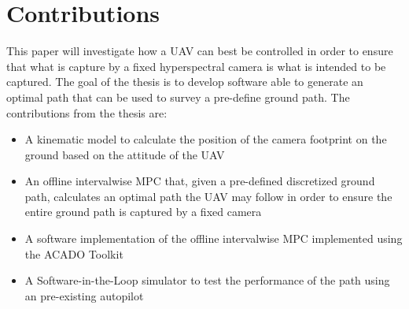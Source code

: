 \section{Contributions}

This paper will investigate how a UAV can best be controlled in order to ensure that what is capture by a fixed hyperspectral camera is what is intended to be captured. The goal of the thesis is to develop software able to generate an optimal path that can be used to survey a pre-define ground path. The contributions from the thesis are:

\begin{itemize}
    \item A kinematic model to calculate the position of the camera footprint on the ground based on the attitude of the UAV
    \item An offline intervalwise MPC that, given a pre-defined discretized ground path, calculates an optimal path the UAV may follow in order to ensure the entire ground path is captured by a fixed camera
    \item A software implementation of the offline intervalwise MPC implemented using the ACADO Toolkit
    \item A Software-in-the-Loop simulator to test the performance of the path using an pre-existing autopilot
\end{itemize}